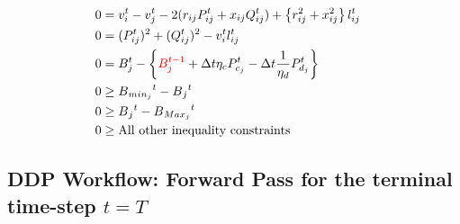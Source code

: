\begin{gather}
\begin{align}
		{0} & = {v_{i}^t - v_{j}^t - 2(r_{ij}P_{ij}^t + x_{ij}Q_{ij}^t) + \left\{r_{ij}^2 + x_{ij}^2\right\}l_{ij}^t}  && \\
		{0} & = {(P_{ij}^{t})^2 + (Q_{ij}^{t})^2 - v_{i}^t l_{ij}^t } \\
		{0} & = {B_{j}^{t} - \left\{ \textcolor{red}{ B_{j}^{t-1} } + \Delta t  \eta_c P_{c_j}^t - \Delta t\frac{1}{\eta_d} P_{d_j}^t \right\} } \\
		{0} & \geq {B{_{min_{j}}}^t - B{_j}^t} \\
		{0} & \geq {B{_j}^t - B{_{Max_{j}}}^t} \\
		{0} & \geq {\text{All other inequality constraints}}
	\end{align}
\end{gather}

\subsection*{DDP Workflow: Forward Pass for the terminal \\ time-step $t = T$}


